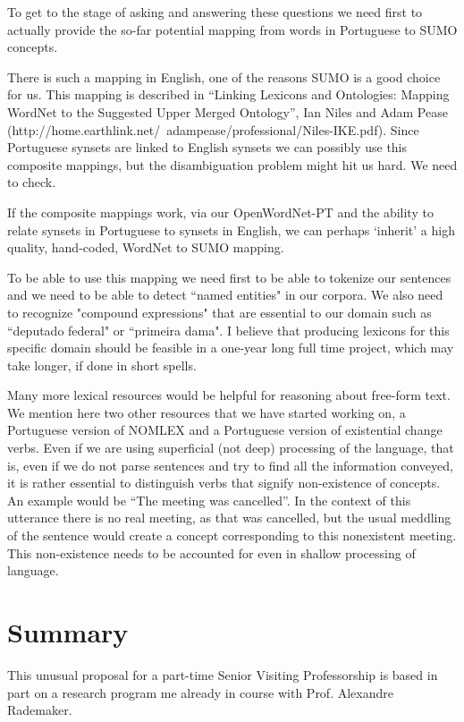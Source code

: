 To get to the stage of asking and answering these questions we need
first to actually provide the so-far potential mapping from words in
Portuguese to SUMO concepts.

There is such a mapping in English, one of the reasons SUMO is a good
choice for us. This mapping is described in ``Linking Lexicons and
Ontologies: Mapping WordNet to the Suggested Upper Merged Ontology'',
Ian Niles and Adam Pease
(http://home.earthlink.net/~adampease/professional/Niles-IKE.pdf). Since
Portuguese synsets are linked to English synsets we can possibly use
this composite mappings, but the disambiguation problem might hit us
hard. We need to check.

If the composite mappings work, via our OpenWordNet-PT and the ability
to relate synsets in Portuguese to synsets in English, we can perhaps
`inherit' a high quality, hand-coded, WordNet to SUMO mapping.

To be able to use this mapping we need first to be able to tokenize
our sentences and we need to be able to detect ``named entities" in
our corpora. We also need to recognize "compound expressions" that are
essential to our domain such as ``deputado federal" or ``primeira
dama". I believe that producing lexicons for this specific domain
should be feasible in a one-year long full time project, which may
take longer, if done in short spells.

Many more lexical resources would be helpful for reasoning about
free-form text. We mention here two other resources that we have
started working on, a Portuguese version of NOMLEX and a Portuguese
version of existential change verbs. Even if we are using superficial
(not deep) processing of the language, that is, even if we do not
parse sentences and try to find all the information conveyed, it is
rather essential to distinguish verbs that signify non-existence of
concepts. An example would be ``The meeting was cancelled''. In the
context of this utterance there is no real meeting, as that was
cancelled, but the usual meddling of the sentence would create a
concept corresponding to this nonexistent meeting. This non-existence
needs to be accounted for even in shallow processing of language.

\section{Summary}

This unusual proposal for a part-time Senior Visiting Professorship is
based in part on a research program me already in course with
Prof. Alexandre Rademaker.

